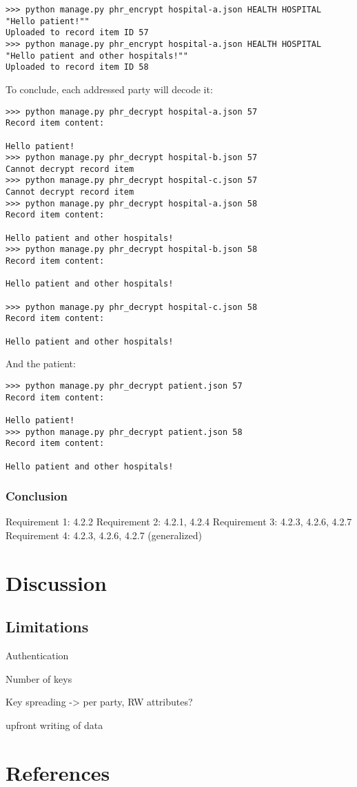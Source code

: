 \documentclass[a4paper]{article}
\begin{document}
			\begin{lstlisting}
>>> python manage.py phr_encrypt hospital-a.json HEALTH HOSPITAL "Hello patient!""
Uploaded to record item ID 57
>>> python manage.py phr_encrypt hospital-a.json HEALTH HOSPITAL "Hello patient and other hospitals!""
Uploaded to record item ID 58
			\end{lstlisting}
			
			To conclude, each addressed party will decode it:

			\begin{lstlisting}
>>> python manage.py phr_decrypt hospital-a.json 57
Record item content:

Hello patient!
>>> python manage.py phr_decrypt hospital-b.json 57
Cannot decrypt record item
>>> python manage.py phr_decrypt hospital-c.json 57
Cannot decrypt record item
>>> python manage.py phr_decrypt hospital-a.json 58
Record item content:

Hello patient and other hospitals!
>>> python manage.py phr_decrypt hospital-b.json 58
Record item content:

Hello patient and other hospitals!

>>> python manage.py phr_decrypt hospital-c.json 58
Record item content:

Hello patient and other hospitals!
			\end{lstlisting}

			And the patient:

			\begin{lstlisting}
>>> python manage.py phr_decrypt patient.json 57
Record item content:

Hello patient!
>>> python manage.py phr_decrypt patient.json 58
Record item content:

Hello patient and other hospitals!
			\end{lstlisting}
		
		\subsubsection{Conclusion}

			Requirement 1: 4.2.2
			Requirement 2: 4.2.1, 4.2.4
			Requirement 3: 4.2.3, 4.2.6, 4.2.7
			Requirement 4: 4.2.3, 4.2.6, 4.2.7 (generalized)
	
\section{Discussion}

	\subsection{Limitations}
		Authentication
		
		Number of keys
		
		Key spreading -> per party, RW attributes?
		
		upfront writing of data

\section{References}
	
	
\end{document}
